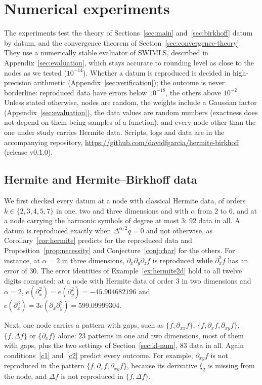\documentclass[12pt]{amsart}
\theoremstyle{definition}
\theoremstyle{remark}
\begin{document}
\section{Numerical experiments}\label{sec:numerics}
The experiments test the theory of Sections~\ref{sec:main} and~\ref{sec:birkhoff} datum by
datum, and the convergence theorem of Section~\ref{sec:convergence-theory}. They use a numerically stable evaluator of SWIMLS, described in
Appendix~\ref{sec:evaluation}, which stays accurate to rounding level as close to the nodes as we
tested ($10^{-14}$). Whether a datum is reproduced is decided in high-precision arithmetic
(Appendix~\ref{sec:verification}); the outcome is never borderline: reproduced data have errors
below $10^{-18}$, the others above $10^{-2}$. Unless stated otherwise, nodes are random, the weights include a
Gaussian factor (Appendix~\ref{sec:evaluation}), the data values are random numbers (exactness does not depend on them being samples of a function),
and every node other than the one under study carries Hermite data. Scripts, logs and data are
in the accompanying repository, \url{https://github.com/davidfgarcia/hermite-birkhoff}
(release v0.1.0).

\subsection{Hermite and Hermite--Birkhoff data}\label{sec:hermite-num}
We first checked every datum at a node with classical Hermite data, of orders $k\in\{2,3,4,5,7\}$ in
one, two and three dimensions and with $\alpha$ from $2$ to $6$, and at a node carrying the
harmonic symbols of degree at most $3$: $92$ data in all. A datum is reproduced exactly when
$\Delta^{\alpha/2}q=0$ and not otherwise, as Corollary~\ref{cor:hermite} predicts for the
reproduced data and Proposition~\ref{prop:necessity} and Conjecture~\ref{conj:char} for the
others. For instance,
at $\alpha=2$ in three dimensions, $\partial_x\partial_y\partial_z f$ is reproduced while
$\partial_x^2 f$ has an error of $30$. The error identities of Example~\ref{ex:hermite2d} hold to
all twelve digits computed: at a node with Hermite data of order $3$ in two dimensions and
$\alpha=2$, $e(\partial_x^2)=e(\partial_y^2)=-45.904682196$ and
$e(\partial_x^3)=3e(\partial_x\partial_y^2)=599.09999304$.

Next, one node carries a pattern with gaps, such as $\{f,\partial_{xx}f\}$,
$\{f,\partial_xf,\partial_{xy}f\}$, $\{f,\Delta f\}$ or $\{\partial_xf\}$ alone: $23$ patterns in
one and two dimensions, most of them with gaps, plus the two settings of Section~\ref{sec:kl-num}, $83$ data in all.
Again conditions~\ref{c1} and~\ref{c2} predict every outcome. For example, $\partial_{xy}f$ is
not reproduced in the pattern $\{f,\partial_xf,\partial_{xy}f\}$, because its derivative
$\xi_2$ is missing from the node, and $\Delta f$ is not reproduced in $\{f,\Delta f\}$.
\end{document}
